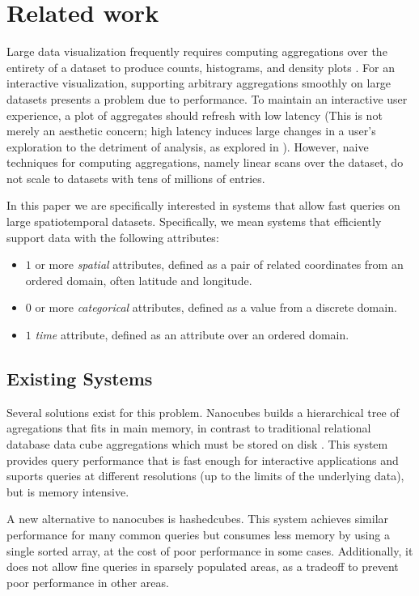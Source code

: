 \documentclass[journal]{vgtc}                %
\begin{document}
\section{Related work}

Large data visualization frequently requires computing aggregations over the
entirety of a dataset to produce counts, histograms, and density plots
\cite{?}. For an interactive visualization, supporting arbitrary aggregations
smoothly on large datasets presents a problem due to performance. To maintain
an interactive user experience, a plot of aggregates should refresh with low
latency (This is not merely an aesthetic concern; high latency induces large
changes in a user's exploration to the detriment of analysis, as explored in
\cite{2014-latency} ). However, naive techniques
for computing aggregations, namely linear scans over the dataset, do not scale
to datasets with tens of millions of entries.

In this paper we are specifically interested in systems that allow fast queries on large spatiotemporal datasets. Specifically, we mean systems that efficiently support data with the following attributes:

\begin{itemize}
	\item $1$ or more \textit{spatial} attributes, defined as a pair of related coordinates from an ordered domain, often latitude and longitude.
	\item $0$ or more \textit{categorical} attributes, defined as a value from a discrete domain.
	\item $1$ \textit{time} attribute, defined as an attribute over an ordered domain.
\end{itemize}

\subsection{Existing Systems}

Several solutions exist for this problem. Nanocubes builds a
hierarchical tree of agregations that fits in main memory, in contrast to
traditional relational database data cube aggregations which must be stored on
disk \cite{nanocubes}. This system provides query performance that is fast
enough for interactive applications and suports queries at different
resolutions (up to the limits of the underlying data), but is memory intensive.

A new alternative to nanocubes is hashedcubes. This system
achieves similar performance for many common queries but consumes less memory
by using a single sorted array, at the cost of poor performance in some cases.
Additionally, it does not allow fine queries in sparsely populated areas, as a
tradeoff to prevent poor performance in other areas.
\end{document}
